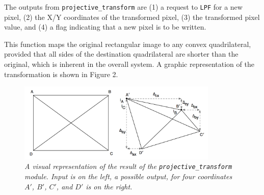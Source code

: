 \documentclass[10pt]{article}
\begin{document}
The outputs from {\tt projective\_transform} are (1) a request to {\tt LPF} for a new pixel, (2) the X/Y coordinates of the transformed pixel, (3) the transformed pixel value, and (4) a flag indicating that a new pixel is to be written.

This function maps the original rectangular image to any convex quadrilateral, provided that all sides of the destination quadrilateral are shorter than the original, which is inherent in the overall system. A graphic representation of the transformation is shown in Figure 2.

\begin{figure}[h!]
\centering
\includegraphics[width=0.85\textwidth]{images/arbiskew_graphic.png}
\caption{\emph{A visual representation of the result of the {\tt projective\_transform} module. Input is on the left, a possible output, for four coordinates $A\prime$, $B\prime$, $C\prime$, and $D\prime$ is on the right.}}
\end{figure}
\end{document}
